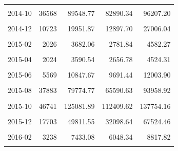 \begin{longtable}[t]{crrrr}
\cellcolor{gray!10}{2014-09} & \cellcolor{gray!10}{42049} & \cellcolor{gray!10}{87446.81} & \cellcolor{gray!10}{75939.45} & \cellcolor{gray!10}{98954.16}\\
2014-10 & 36568 & 89548.77 & 82890.34 & 96207.20\\
\cellcolor{gray!10}{2014-11} & \cellcolor{gray!10}{17667} & \cellcolor{gray!10}{29011.60} & \cellcolor{gray!10}{23121.13} & \cellcolor{gray!10}{34902.07}\\
2014-12 & 10723 & 19951.87 & 12897.70 & 27006.04\\
\cellcolor{gray!10}{2015-01} & \cellcolor{gray!10}{4313} & \cellcolor{gray!10}{9429.05} & \cellcolor{gray!10}{7175.21} & \cellcolor{gray!10}{11682.90}\\
2015-02 & 2026 & 3682.06 & 2781.84 & 4582.27\\
\cellcolor{gray!10}{2015-03} & \cellcolor{gray!10}{1659} & \cellcolor{gray!10}{921.61} & \cellcolor{gray!10}{-966.31} & \cellcolor{gray!10}{2809.52}\\
2015-04 & 2024 & 3590.54 & 2656.78 & 4524.31\\
\cellcolor{gray!10}{2015-05} & \cellcolor{gray!10}{2169} & \cellcolor{gray!10}{3940.26} & \cellcolor{gray!10}{2975.35} & \cellcolor{gray!10}{4905.18}\\
2015-06 & 5569 & 10847.67 & 9691.44 & 12003.90\\
\cellcolor{gray!10}{2015-07} & \cellcolor{gray!10}{8541} & \cellcolor{gray!10}{18130.81} & \cellcolor{gray!10}{13938.46} & \cellcolor{gray!10}{22323.17}\\
2015-08 & 37883 & 79774.77 & 65590.63 & 93958.92\\
\cellcolor{gray!10}{2015-09} & \cellcolor{gray!10}{61739} & \cellcolor{gray!10}{164439.87} & \cellcolor{gray!10}{154108.91} & \cellcolor{gray!10}{174770.82}\\
2015-10 & 46741 & 125081.89 & 112409.62 & 137754.16\\
\cellcolor{gray!10}{2015-11} & \cellcolor{gray!10}{26411} & \cellcolor{gray!10}{62560.16} & \cellcolor{gray!10}{51240.81} & \cellcolor{gray!10}{73879.52}\\
2015-12 & 17703 & 49811.55 & 32098.64 & 67524.46\\
\cellcolor{gray!10}{2016-01} & \cellcolor{gray!10}{5960} & \cellcolor{gray!10}{15645.02} & \cellcolor{gray!10}{11220.31} & \cellcolor{gray!10}{20069.72}\\
2016-02 & 3238 & 7433.08 & 6048.34 & 8817.82\\
\cellcolor{gray!10}{2016-03} & \cellcolor{gray!10}{3425} & \cellcolor{gray!10}{9051.00} & \cellcolor{gray!10}{7600.77} & \cellcolor{gray!10}{10501.22}\\

\end{longtable}

